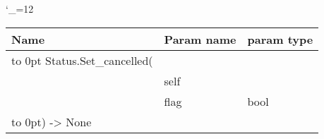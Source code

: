 \begingroup \catcode`\_=12 \tt
\begin{tabular}{lll}
\toprule
\textrm{Name}&\textrm{Param name}&\textrm{param type}\\
\midrule
\hbox to 0pt {Status.Set_cancelled(\hss}\\
& self\\
& flag & bool\\
\hbox to 0pt{) -> None\hss}\\
\bottomrule
\end{tabular}
\endgroup
